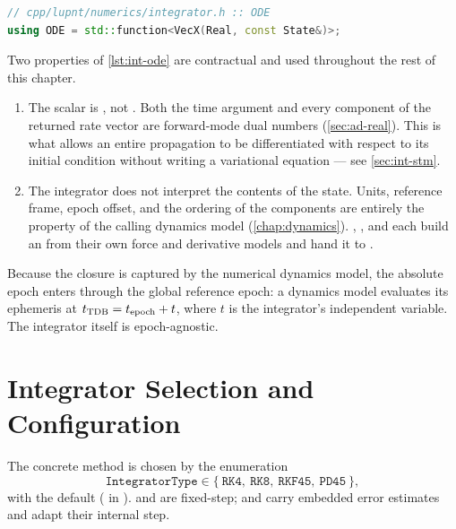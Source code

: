 \begin{lstlisting}[language=cpp, caption={Right-hand side type. Source: \code{cpp/lupnt/numerics/integrator.h}}, label={lst:int-ode}]
// cpp/lupnt/numerics/integrator.h :: ODE
using ODE = std::function<VecX(Real, const State&)>;
\end{lstlisting}

Two properties of \cref{lst:int-ode} are contractual and used throughout the
rest of this chapter.

\begin{enumerate}[leftmargin=1.5cm]
  \item The scalar is , not . Both the time argument and
    every component of the returned rate vector are forward-mode dual numbers
    (\cref{sec:ad-real}). This is what allows an entire propagation to be
    differentiated with respect to its initial condition without writing a
    variational equation --- see \cref{sec:int-stm}.
  \item The integrator does not interpret the contents of the state. Units,
    reference frame, epoch offset, and the ordering of the components are
    entirely the property of the calling dynamics model
    (\cref{chap:dynamics}). ,
    , and  each build an
     from their own force and derivative models and hand it to
    .
\end{enumerate}

\begin{lupntnote}
  Because the  closure is captured by the numerical dynamics model,
  the absolute epoch enters through the global reference epoch: a dynamics
  model evaluates its ephemeris at $t_{\mathrm{TDB}} = t_{\mathrm{epoch}} + t$, where
  $t$ is the integrator's independent variable. The integrator itself is
  epoch-agnostic.
\end{lupntnote}

\section{Integrator Selection and Configuration}
\label{sec:int-selection}

The concrete method is chosen by the enumeration
\begin{equation}
  \label{eq:int-types}
  \texttt{IntegratorType} \in
  \{\ \texttt{RK4},\ \texttt{RK8},\ \texttt{RKF45},\ \texttt{PD45}\ \},
\end{equation}
with  the default ( in
).  and  are
fixed-step;  and  carry embedded error estimates and
adapt their internal step.

